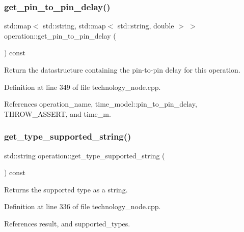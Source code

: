 \subsubsection{\texorpdfstring{get\+\_\+pin\+\_\+to\+\_\+pin\+\_\+delay()}{get\_pin\_to\_pin\_delay()}}
{\footnotesize\ttfamily std\+::map$<$ std\+::string, std\+::map$<$ std\+::string, double $>$ $>$ operation\+::get\+\_\+pin\+\_\+to\+\_\+pin\+\_\+delay (\begin{DoxyParamCaption}{ }\end{DoxyParamCaption}) const}



Return the datastructure containing the pin-\/to-\/pin delay for this operation. 



Definition at line 349 of file technology\+\_\+node.\+cpp.



References operation\+\_\+name, time\+\_\+model\+::pin\+\_\+to\+\_\+pin\+\_\+delay, T\+H\+R\+O\+W\+\_\+\+A\+S\+S\+E\+RT, and time\+\_\+m.

\mbox{\label{structoperation_a4ee8a603c8de43b79716ab1111b53a52}} 
\subsubsection{\texorpdfstring{get\+\_\+type\+\_\+supported\+\_\+string()}{get\_type\_supported\_string()}}
{\footnotesize\ttfamily std\+::string operation\+::get\+\_\+type\+\_\+supported\+\_\+string (\begin{DoxyParamCaption}{ }\end{DoxyParamCaption}) const}



Returns the supported type as a string. 



Definition at line 336 of file technology\+\_\+node.\+cpp.



References result, and supported\+\_\+types.

\mbox{\label{structoperation_a28d9e2b1f452d667cdf74afa81d896ea}} 
